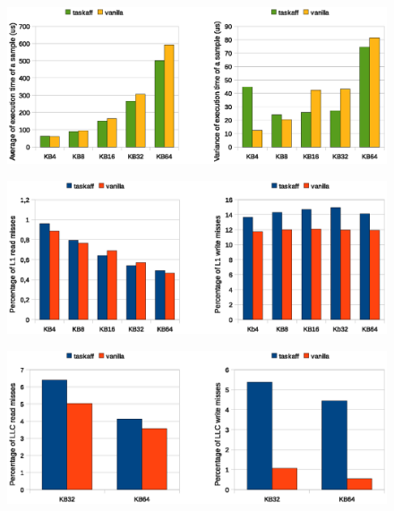 \begin{figure}[htbp]
\centering
\includegraphics[width=\widefigure]{images/results_xeon/time_avg_var.eps}
\caption{}
\label{fig:time_avg_var_xeon}
\end{figure}

\begin{figure}[htbp]
\centering
\includegraphics[width=\widefigure]{images/results_xeon/l1_load_store_xeon.eps}
\caption{}
\label{fig:l1_load_store_xeon}
\end{figure}

\begin{figure}[htbp]
\centering
\includegraphics[width=\widefigure]{images/results_xeon/l2_load_store_xeon.eps}
\caption{}
\label{fig:l2_load_store_xeon}
\end{figure}

